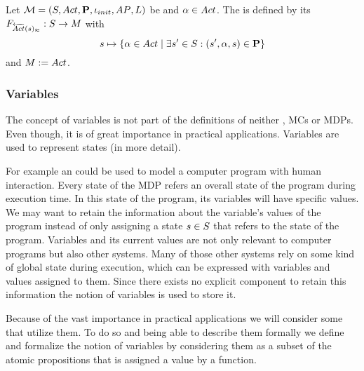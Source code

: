 \documentclass[preview]{standalone}
\begin{document}
\begin{definition}
	Let ${{{\mathcal{M}}}} = {{({S}, {Act}, {\textbf{P}}, {\iota_{init}}, {AP}, {L})}}$ be \chosengraphtypeN and ${\alpha} \in {Act}$. The \viewN \viewweakinactident is defined by its \grpfctN ${{F_{{\overleftarrow{{Act}}}({s})_\approx}}} : {S} \to {\ensuremath{{M}}}$ with
	\[
	{s} \mapsto \{{\alpha} \in {Act} \mid \exists {s}' \in {S} : ({s}', {\alpha}, {s}) \in {\ensuremath{{\textbf{P}}}}\} 	
	\]
	and ${{M}} := {Act}$.
\end{definition}

\subsubsection{Variables}
The concept of variables is not part of the definitions of neither \chosengraphtypesN, MCs or MDPs. Even though, it is of great importance in practical applications. Variables are used to represent states (in more detail). 

For example an \mdpN could be used to model a computer program with human interaction. Every state of the MDP refers an overall state of the program during execution time. In this state of the program, its variables will have specific values. We may want to retain the information about the variable's values of the program instead of only assigning a state ${s} \in {S}$ that refers to the state of the program. Variables and its current values are not only relevant to computer programs but also other systems. Many of those other systems rely on some kind of global state during execution, which can be expressed with variables and values assigned to them. Since there exists no explicit component to retain this information the notion of variables is used to store it.


Because of the vast importance in practical applications we will consider some \viewsN that utilize them. To do so and being able to describe them formally we define and formalize the notion of variables by considering them as a subset of the atomic propositions \atomicprops that is assigned a value by a function.
\end{document}
